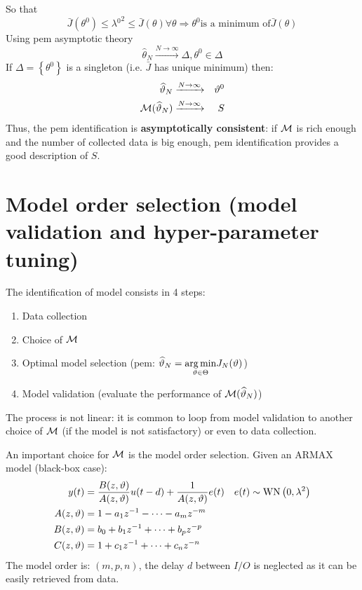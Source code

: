 So that
\begin{equation*}
\bar{J}\left(\theta ^{0}\right) \leq \lambda {^{0}}^{2} \leq \bar{J}(\theta) \forall \theta \Longrightarrow \theta ^{0} \text{is a minimum of} \bar{J}(\theta)
\end{equation*}
Using \gls{pem} asymptotic theory
\begin{equation*}
\hat{\theta }_{N}\xrightarrow{N\rightarrow \infty} \Delta ,\theta ^{0} \in \Delta 
\end{equation*}
If $ \Delta =\left\{\theta ^{0}\right\}$ is a singleton (i.e. $ \bar{J}$ has unique minimum) then:
\begin{equation*}
\begin{aligned}
\widehat{\vartheta }_{N} & \xrightarrow{N\rightarrow \infty} & \vartheta ^{0}\\
\mathcal{M}(\widehat{\vartheta }_{N}) & \xrightarrow{N\rightarrow \infty} & S
\end{aligned}
\end{equation*}
Thus, the \gls{pem} identification is \textbf{asymptotically consistent}: if $ \mathcal{M}$ is rich enough and the number of collected data is big enough, \gls{pem} identification provides a good description of $ S$.



\section{Model order selection (model validation and hyper-parameter tuning)}

The identification of model consists in 4 steps:
\begin{enumerate}
\item Data collection
\item Choice of $ \mathcal{M}$
\item Optimal model selection (\gls{pem}: $ \widehat{\vartheta }_{N} =\underset{\vartheta \in \Theta }{\operatorname*{arg\,min}} J_{N}(\vartheta)$)
\item Model validation (evaluate the performance of $\mathcal{M}(\widehat{\vartheta }_{N})$)
\end{enumerate}

The process is not linear: it is common to loop from model validation to another choice of $ \mathcal{M}$ (if the model is not satisfactory) or even to data collection.

An important choice for $ \mathcal{M}$ is the model order selection. Given an ARMAX model (black-box case):
\begin{gather*}
\begin{aligned}
y(t)  & =\frac{B(z,\vartheta)}{A(z,\vartheta)} u(t-d) +\frac{1}{A(z,\vartheta)} e(t) & e(t) \sim \operatorname{WN} \left(0,\lambda ^{2}\right)\\
A(z,\vartheta)  & =1-a_{1} z^{-1} -\cdots -a_{m} z^{-m} & \\
B(z,\vartheta) & =b_{0} +b_{1} z^{-1} +\cdots +b_{p} z^{-p} & \\
C(z,\vartheta) & =1+c_{1} z^{-1} +\cdots +c_{n} z^{-n} & 
\end{aligned}\\
\end{gather*}
The model order is: $ (m,p,n)$, the delay $ d$ between $ I/O$ is neglected as it can be easily retrieved from data.

